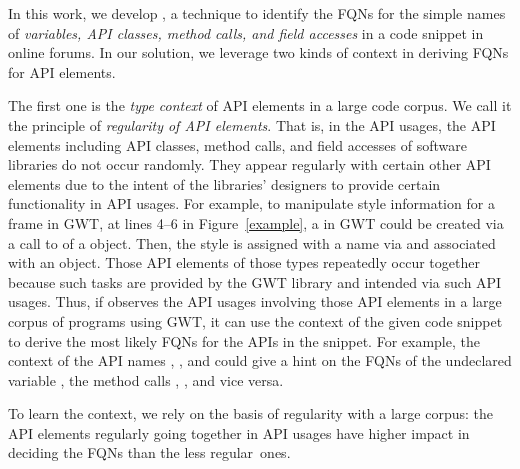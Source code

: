 
In this work, we develop {\tool}, a technique to identify the FQNs for
the simple names of {\em variables, API classes, method calls, and
  field accesses} in a code snippet in online forums.
%
In our solution, we leverage two kinds of context in deriving FQNs for
API elements. 

The first one is the {\em type context} of API elements in a
large code corpus. We call it the principle of {\em regularity of API
  elements}.
That is, in the API usages, the API elements including API classes,
method calls, and field accesses of software libraries do not occur
randomly. They appear regularly with certain other API elements due to
the intent of the libraries' designers to provide certain
functionality in API usages. For example, to manipulate style
information for a frame in GWT, at lines 4--6 in Figure~\ref{example},
a  in GWT could be created via a call to
 of a  object. Then, the style
is assigned with a name via  and
associated with an  object. Those API elements of
those types repeatedly occur together because such tasks are provided
by the GWT library and intended via such API usages. Thus, if {\tool}
observes the API usages involving those API elements in a large corpus
of programs using GWT, it can use the context of the given code
snippet to derive the most likely FQNs for the APIs in the
snippet. For example, the context of the API names
, , and 
could give {\tool} a hint on the FQNs of the undeclared variable
, the method calls ,
, and vice versa.

To learn the context, we rely on the basis of regularity with a large
corpus: the API elements regularly going together in API
usages have higher impact in deciding the FQNs than the less
regular~ones.



